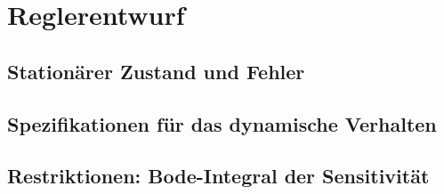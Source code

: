 \section{Reglerentwurf}
\subsection{Stationärer Zustand und Fehler}

\subsection{Spezifikationen für das dynamische Verhalten}


\subsection{Restriktionen: Bode-Integral der Sensitivität}